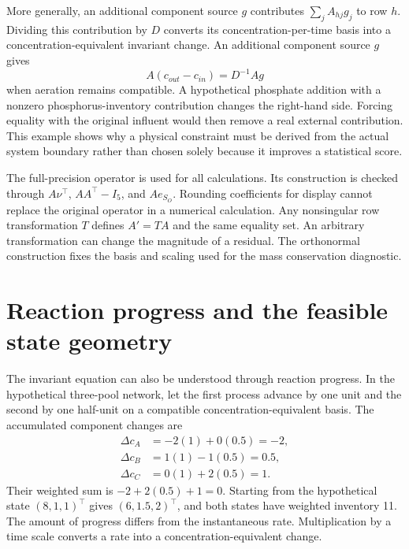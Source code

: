 More generally, an additional component source $g$ contributes $\sum_jA_{hj}g_j$ to row $h$. Dividing this contribution by $D$ converts its concentration-per-time basis into a concentration-equivalent invariant change. An additional component source $g$ gives
\begin{equation}
A(c_{out}-c_{in})=D^{-1}Ag
\label{eq:general_invariant_source}
\end{equation}
when aeration remains compatible. A hypothetical phosphate addition with a nonzero phosphorus-inventory contribution changes the right-hand side. Forcing equality with the original influent would then remove a real external contribution. This example shows why a physical constraint must be derived from the actual system boundary rather than chosen solely because it improves a statistical score.

The full-precision operator is used for all calculations. Its construction is checked through $A\nu^\top$, $AA^\top-I_5$, and $Ae_{S_O}$. Rounding coefficients for display cannot replace the original operator in a numerical calculation. Any nonsingular row transformation $T$ defines $A'=TA$ and the same equality set. An arbitrary transformation can change the magnitude of a residual. The orthonormal construction fixes the basis and scaling used for the mass conservation diagnostic.

\section{Reaction progress and the feasible state geometry}

The invariant equation can also be understood through reaction progress. In the hypothetical three-pool network, let the first process advance by one unit and the second by one half-unit on a compatible concentration-equivalent basis. The accumulated component changes are
\[
\begin{aligned}
\Delta c_A&=-2(1)+0(0.5)=-2,\\
\Delta c_B&=1(1)-1(0.5)=0.5,\\
\Delta c_C&=0(1)+2(0.5)=1.
\end{aligned}
\]
Their weighted sum is $-2+2(0.5)+1=0$. Starting from the hypothetical state $(8,1,1)^\top$ gives $(6,1.5,2)^\top$, and both states have weighted inventory 11. The amount of progress differs from the instantaneous rate. Multiplication by a time scale converts a rate into a concentration-equivalent change.

